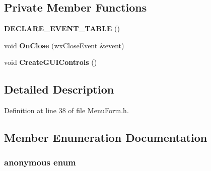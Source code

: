 \subsection*{Private Member Functions}
\begin{CompactItemize}
\item 
{\bf DECLARE\_\-EVENT\_\-TABLE} ()
\item 
void {\bf On\-Close} (wx\-Close\-Event \&event)
\item 
void {\bf Create\-GUIControls} ()
\end{CompactItemize}


\subsection{Detailed Description}




Definition at line 38 of file Menu\-Form.h.

\subsection{Member Enumeration Documentation}
\subsubsection{\setlength{\rightskip}{0pt plus 5cm}anonymous enum\hspace{0.3cm}{\tt  [private]}}\label{class_menu_form_7ba2c580be83fbfc0f895ba41f1ee97f}


